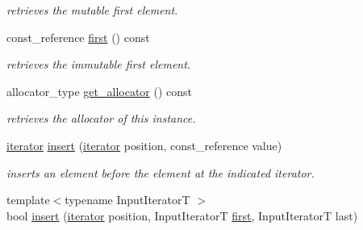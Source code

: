 \begin{DoxyCompactItemize}
\begin{DoxyCompactList}\small\item\em retrieves the mutable first element. \end{DoxyCompactList}\item 
\hypertarget{classhryky_1_1_vector_a86c548a5cc9e116c60a304ff84640ec5}{const\-\_\-reference \hyperlink{classhryky_1_1_vector_a86c548a5cc9e116c60a304ff84640ec5}{first} () const }\label{classhryky_1_1_vector_a86c548a5cc9e116c60a304ff84640ec5}

\begin{DoxyCompactList}\small\item\em retrieves the immutable first element. \end{DoxyCompactList}\item 
\hypertarget{classhryky_1_1_vector_a435d9e9b71aaf09e9281e671742ba2e0}{allocator\-\_\-type \hyperlink{classhryky_1_1_vector_a435d9e9b71aaf09e9281e671742ba2e0}{get\-\_\-allocator} () const }\label{classhryky_1_1_vector_a435d9e9b71aaf09e9281e671742ba2e0}

\begin{DoxyCompactList}\small\item\em retrieves the allocator of this instance. \end{DoxyCompactList}\item 
\hypertarget{classhryky_1_1_vector_a5056ac0ef6663b935bea8271c33ff126}{\hyperlink{classhryky_1_1iterator_1_1random_1_1_mutable}{iterator} \hyperlink{classhryky_1_1_vector_a5056ac0ef6663b935bea8271c33ff126}{insert} (\hyperlink{classhryky_1_1iterator_1_1random_1_1_mutable}{iterator} position, const\-\_\-reference value)}\label{classhryky_1_1_vector_a5056ac0ef6663b935bea8271c33ff126}

\begin{DoxyCompactList}\small\item\em inserts an element before the element at the indicated iterator. \end{DoxyCompactList}\item 
\hypertarget{classhryky_1_1_vector_aea52cb653910c83ccb2951f1e5d51d7d}{{\footnotesize template$<$typename Input\-Iterator\-T $>$ }\\bool \hyperlink{classhryky_1_1_vector_aea52cb653910c83ccb2951f1e5d51d7d}{insert} (\hyperlink{classhryky_1_1iterator_1_1random_1_1_mutable}{iterator} position, Input\-Iterator\-T \hyperlink{classhryky_1_1_vector_ad7e5eb625467631e061a979bd2060f78}{first}, Input\-Iterator\-T last)}\label{classhryky_1_1_vector_aea52cb653910c83ccb2951f1e5d51d7d}


\end{DoxyCompactItemize}
